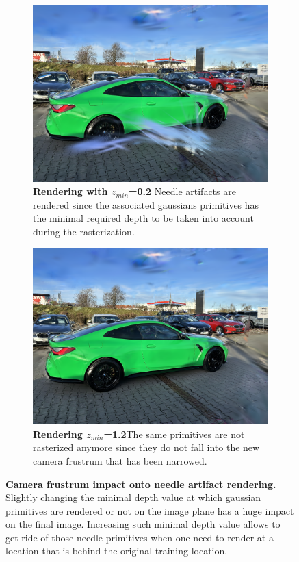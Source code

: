 \begin{figure}[htb!]
  \centering
  \begin{subfigure}[b]{0.45\linewidth}
    \includegraphics[width=\linewidth]{images/gaussiansplatting/needle-artifact.png}
    \caption{\textbf{Rendering with $z_{min}$=0.2} Needle artifacts are rendered since the associated gaussians primitives has the minimal required depth to be taken into account during the rasterization.}
  \end{subfigure}
  \quad %
  \begin{subfigure}[b]{0.45\linewidth}
    \includegraphics[width=\linewidth]{images/gaussiansplatting/needle-free-artifact.png}
    \caption{\textbf{Rendering $z_{min}$=1.2}The same primitives are not rasterized anymore since they do not fall into the new camera frustrum that has been narrowed. }
  \end{subfigure}
  \caption{\textbf{Camera frustrum impact onto needle artifact rendering.} Slightly changing the minimal depth value at which gaussian primitives are rendered or not on the image plane has a huge impact on the final image. Increasing such minimal depth value allows to get ride of those needle primitives when one need to render at a location that is behind the original training location.}
  \label{fig:floater-removed}
\end{figure}

